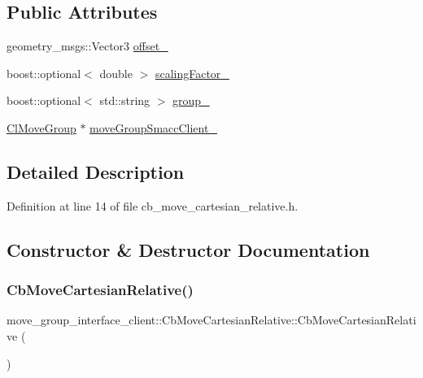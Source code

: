 \subsection*{Public Attributes}
\begin{DoxyCompactItemize}
\item 
geometry\+\_\+msgs\+::\+Vector3 \hyperlink{classmove__group__interface__client_1_1CbMoveCartesianRelative_affe67c635e1cd77013609a784ac53b92}{offset\+\_\+}
\item 
boost\+::optional$<$ double $>$ \hyperlink{classmove__group__interface__client_1_1CbMoveCartesianRelative_a62cdf88c437312ac79c8acc01519d634}{scaling\+Factor\+\_\+}
\item 
boost\+::optional$<$ std\+::string $>$ \hyperlink{classmove__group__interface__client_1_1CbMoveCartesianRelative_a5da33d1b7d822c971f8e282e5ade7238}{group\+\_\+}
\item 
\hyperlink{classmove__group__interface__client_1_1ClMoveGroup}{Cl\+Move\+Group} $\ast$ \hyperlink{classmove__group__interface__client_1_1CbMoveCartesianRelative_aaa8b86680f04a6cfd7ac6b42268bf04d}{move\+Group\+Smacc\+Client\+\_\+}
\end{DoxyCompactItemize}


\subsection{Detailed Description}


Definition at line 14 of file cb\+\_\+move\+\_\+cartesian\+\_\+relative.\+h.



\subsection{Constructor \& Destructor Documentation}
\mbox{\label{classmove__group__interface__client_1_1CbMoveCartesianRelative_acb71f733e58a5f5c2d8e4cc5dad9768f}} 
\subsubsection{\texorpdfstring{Cb\+Move\+Cartesian\+Relative()}{CbMoveCartesianRelative()}\hspace{0.1cm}{\footnotesize\ttfamily [1/2]}}
{\footnotesize\ttfamily move\+\_\+group\+\_\+interface\+\_\+client\+::\+Cb\+Move\+Cartesian\+Relative\+::\+Cb\+Move\+Cartesian\+Relative (\begin{DoxyParamCaption}{ }\end{DoxyParamCaption})}



